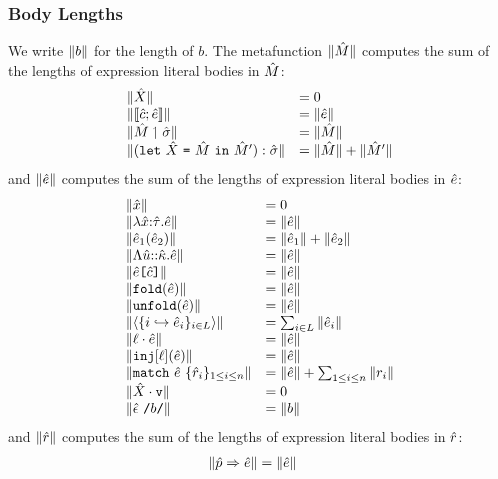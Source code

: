 \subsubsection{Body Lengths}
We write $\Vert b \Vert$ for the length of $b$. 
The metafunction $\Vert {\hat M} \Vert$ computes the sum of the lengths of expression literal bodies in ${\hat M}$:
\[
\begin{array}{ll}
\Vert {\hat X} \Vert & = 0\\
\Vert \llbracket {\hat c}; {\hat e} \rrbracket \Vert & = \Vert {\hat e} \Vert\\
\Vert {\hat M} \upharpoonleft {\hat\sigma} \Vert & = \Vert {\hat M} \Vert\\
\Vert (\texttt{let}~{\hat X}~\texttt{=}~{\hat M}~\texttt{in}~{\hat M}') : {\hat\sigma} \Vert & = \Vert {\hat M} \Vert + \Vert {\hat M}' \Vert
\end{array}
\]
and $\Vert {\hat e} \Vert$ computes the sum of the lengths of expression literal bodies in ${\hat e}$:
\[
\begin{array}{ll}
\Vert {\hat x} \Vert & = 0\\
\Vert \lambda {\hat x}{:}{\hat\tau}.{\hat e} \Vert &= \Vert {\hat e} \Vert\\
\Vert {\hat e}_1({\hat e}_2) \Vert & = \Vert {\hat e}_1 \Vert + \Vert {\hat e}_2 \Vert\\
\Vert \Lambda {\hat u}{::}{\hat\kappa}.{\hat e} \Vert & = \Vert {\hat e} \Vert\\
\Vert {\hat e}\texttt{[}{\hat c}\texttt{]} \Vert & = \Vert {\hat e} \Vert\\
\Vert \texttt{fold}({\hat e}) \Vert & = \Vert {\hat e} \Vert\\
\Vert \texttt{unfold}({\hat e}) \Vert & = \Vert {\hat e} \Vert\\
\Vert \langle \{i \hookrightarrow {\hat e}_{i}\}_{i \in L}\rangle \Vert & = \sum_{i \in L} \Vert {\hat e}_i \Vert\\
\Vert \ell \cdot {\hat e} \Vert & = \Vert {\hat e} \Vert\\
\Vert \texttt{inj}[\ell]({\hat e}) \Vert & = \Vert {\hat e} \Vert\\
\Vert \texttt{match}~{\hat e}~\{\hat{r}_{i}\}_{1 \leq i \leq n} \Vert & = \Vert {\hat e} \Vert + \sum_{1 \leq i \leq n} \Vert r_i \Vert\\
\Vert {\hat X} \cdot \texttt{v} \Vert & = 0\\
\Vert {\hat\epsilon}~\texttt{/}b\texttt{/} \Vert & = \Vert b \Vert
\end{array}
\]
and $\Vert \hat{r} \Vert$ computes the sum of the lengths of expression literal bodies in $\hat{r}$:
\begin{align*}
\Vert \hat{p} \Rightarrow {\hat e} \Vert & = \Vert {\hat e} \Vert
\end{align*}
